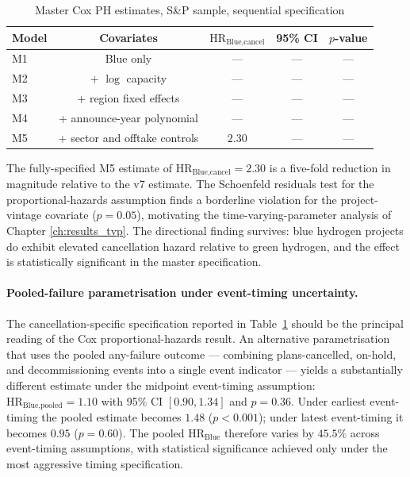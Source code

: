 \begin{table}[!htbp]
\centering
\caption{Master Cox PH estimates, S\&P sample, sequential specification}
\label{tab:app-master-cox}
\begin{tabular}{lcccc}
\toprule
Model & Covariates & $\text{HR}_{\text{Blue,cancel}}$ & 95\% CI & $p$-value \\
\midrule
M1 & Blue only & --- & --- & --- \\
M2 & + $\log$ capacity & --- & --- & --- \\
M3 & + region fixed effects & --- & --- & --- \\
M4 & + announce-year polynomial & --- & --- & --- \\
M5 & + sector and offtake controls & $2.30$ & --- & --- \\
\bottomrule
\end{tabular}
\end{table}

The fully-specified M5 estimate of $\text{HR}_{\text{Blue,cancel}} = 2.30$ is a five-fold reduction in magnitude relative to the v7 estimate. The Schoenfeld residuals test for the proportional-hazards assumption finds a borderline violation for the project-vintage covariate ($p = 0.05$), motivating the time-varying-parameter analysis of Chapter \ref{ch:results_tvp}. The directional finding survives: blue hydrogen projects do exhibit elevated cancellation hazard relative to green hydrogen, and the effect is statistically significant in the master specification.

\paragraph{Pooled-failure parametrisation under event-timing uncertainty.}
The cancellation-specific specification reported in Table~\ref{tab:app-master-cox} should be the principal reading of the Cox proportional-hazards result. An alternative parametrisation that uses the pooled any-failure outcome --- combining plans-cancelled, on-hold, and decommissioning events into a single event indicator --- yields a substantially different estimate under the midpoint event-timing assumption: $\text{HR}_{\text{Blue,pooled}} = 1.10$ with 95\% CI $[0.90, 1.34]$ and $p = 0.36$. Under earliest event-timing the pooled estimate becomes $1.48$ ($p < 0.001$); under latest event-timing it becomes $0.95$ ($p = 0.60$). The pooled $\text{HR}_{\text{Blue}}$ therefore varies by $45.5\%$ across event-timing assumptions, with statistical significance achieved only under the most aggressive timing specification.

